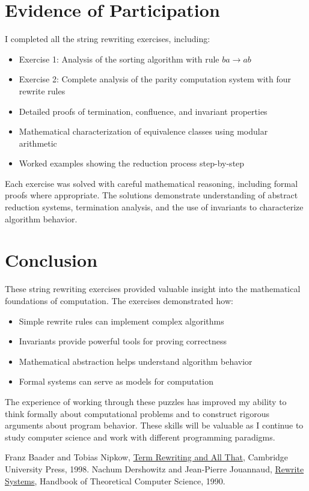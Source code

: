 \documentclass{article}
\theoremstyle{plain}
\theoremstyle{definition}
\theoremstyle{remark}
\begin{document}
\section{Evidence of Participation}

I completed all the string rewriting exercises, including:

\begin{itemize}
\item Exercise 1: Analysis of the sorting algorithm with rule $ba \to ab$
\item Exercise 2: Complete analysis of the parity computation system with four rewrite rules
\item Detailed proofs of termination, confluence, and invariant properties
\item Mathematical characterization of equivalence classes using modular arithmetic
\item Worked examples showing the reduction process step-by-step
\end{itemize}

Each exercise was solved with careful mathematical reasoning, including formal proofs where appropriate. The solutions demonstrate understanding of abstract reduction systems, termination analysis, and the use of invariants to characterize algorithm behavior.

\section{Conclusion}\label{conclusion}

These string rewriting exercises provided valuable insight into the mathematical foundations of computation. The exercises demonstrated how:

\begin{itemize}
\item Simple rewrite rules can implement complex algorithms
\item Invariants provide powerful tools for proving correctness
\item Mathematical abstraction helps understand algorithm behavior
\item Formal systems can serve as models for computation
\end{itemize}

The experience of working through these puzzles has improved my ability to think formally about computational problems and to construct rigorous arguments about program behavior. These skills will be valuable as I continue to study computer science and work with different programming paradigms.

\begin{thebibliography}{99}
 Franz Baader and Tobias Nipkow, \href{https://en.wikipedia.org/wiki/Abstract_rewriting_system}{Term Rewriting and All That}, Cambridge University Press, 1998.
 Nachum Dershowitz and Jean-Pierre Jouannaud, \href{https://en.wikipedia.org/wiki/Term_rewriting}{Rewrite Systems}, Handbook of Theoretical Computer Science, 1990.
\end{thebibliography}
\end{document}
